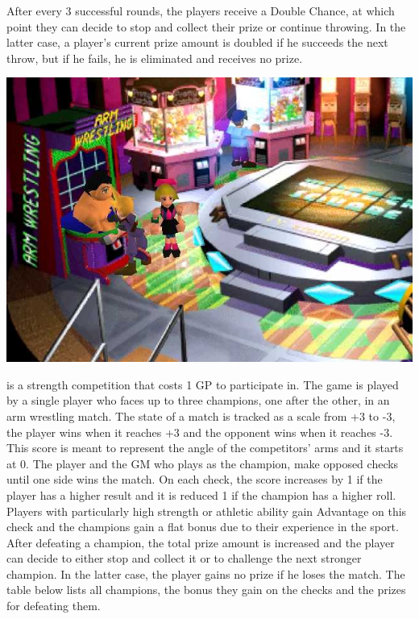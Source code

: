 After every 3 successful rounds, the players receive a Double Chance, at which point they can decide to stop and collect their prize or continue throwing.
In the latter case, a player's current prize amount is doubled if he succeeds the next throw, but if he fails, he is eliminated and receives no prize.
%
\vfill
%
%
\vfill
%
%
%
%
\begin{center} \includegraphics[width=\columnwidth]{./art/goldsaucer/armwrestling.jpg} \end{center}
 is a strength competition that costs 1 GP to participate in.
The game is played by a single player who faces up to three champions, one after the other, in an arm wrestling match.
The state of a match is tracked as a scale from +3 to -3, the player wins when it reaches +3 and the opponent wins when it reaches -3.
This score is meant to represent the angle of the competitors' arms and it starts at 0.
The player and the GM who plays as the champion, make opposed checks until one side wins the match.
On each check, the score increases by 1 if the player has a higher result and it is reduced 1 if the champion has a higher roll.
Players with particularly high strength or athletic ability gain Advantage on this check and the champions gain a flat bonus due to their experience in the sport.
After defeating a champion, the total prize amount is increased and the player can decide to either stop and collect it or to challenge the next stronger champion.
In the latter case, the player gains no prize if he loses the match.
The table below lists all champions, the bonus they gain on the checks and the prizes for defeating them.

